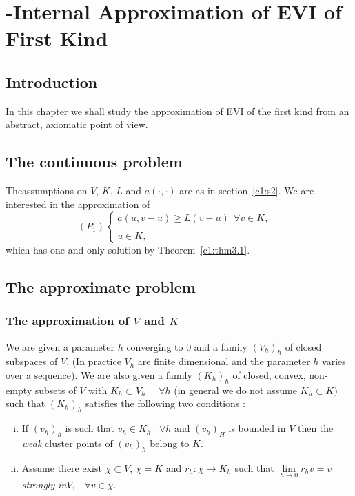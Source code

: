 \section{-Internal Approximation of EVI of First Kind}\label{c1:s5}%

\subsection{Introduction}\label{c1:ss5.1}%

In this chapter we shall study the approximation of EVI of the first
kind from an abstract, axiomatic point of view. 

\subsection{The continuous problem}\label{c1:ss5.2}%

The\pageoriginale assumptions on $V$, $K$, $L$ and $a(\cdot , \cdot)$ are as in 
section~\ref{c1:s2}. We are interested in the approximation of
\begin{equation*}
(P_1) 
\begin{cases}
a(u, v - u) \geq L(v - u) ~~\forall v \in K,\\
&\\
u \in K,
\end{cases}
\end{equation*}
which has one and only solution by Theorem~\ref{c1:thm3.1}.

\subsection{The approximate problem}\label{c1:ss5.3}%
 
\subsubsection{The approximation of $V$ and $K$}\label{c1:sss5.3.1}

We are given a parameter $h$ converging to $0$ and a family $(V_h)_h$
of closed subspaces of $V$. (In practice $V_h$ are finite dimensional
and the parameter $h$ varies over a sequence). We are also given a
family $(K_h)_h$ of closed, convex, non-empty subsets of $V$ with $K_h
\subset V_h$ ~~$\forall h$ (in general we do not assume $K_h \subset
K)$ such that $(K_h)_h$ satisfies the following two conditions : 

\begin{enumerate}[(i)]
\item If $(v_h)_h$ is such that $v_h \in K_h$ ~$\forall h$ and
  $(v_h)_H$ is bounded in $V$ then the \textit{weak} cluster points of
  $(v_h)_h$ belong to $K$. 

\item Assume there exist $\chi \subset V$, $\bar{\chi} = K$ and $r_h :
  \chi \to K_h$ such that $\lim \limits_{h \to 0} r_h v=v$
  \textit{strongly in}$V$,~~$\forall v \in \chi$. 
\end{enumerate}

